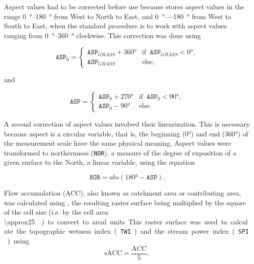 Aspect values had to be corrected before use because  stores aspect values in the range 
\SIrange{0}{+180}{\degree} from West to North to East, and \SIrange{0}{-180}{\degree} from West to South to 
East, when the standard procedure is to work with aspect values ranging from \SIrange{0}{360}{\degree} 
clockwise. This correction was done using

\begin{equation}
 \texttt{ASP}_{0} =
 \begin{cases}
  \texttt{ASP}_{GRASS} + \ang{360} & \text{if}\;\; \texttt{ASP}_{GRASS} < \ang{0}, \\
  \texttt{ASP}_{GRASS}             & \text{else},
 \end{cases}
\end{equation}

\noindent and

\begin{equation}
 \texttt{ASP} =
 \begin{cases}
  \texttt{ASP}_{0} + \ang{270} & \text{if}\;\; \texttt{ASP}_{0} < \ang{90}, \\
  \texttt{ASP}_{0} - \ang{90}  & \text{else}.
 \end{cases}
\end{equation}

\noindent A second correction of aspect values involved their linearization. This is necessary because aspect 
is a circular variable, that is, the beginning (\ang{0}) and end (\ang{360}) of the measurement scale have the 
same physical meaning. Aspect values were transformed to northernness (\texttt{NOR}), a measure of the degree 
of exposition of a given surface to the North, a linear variable, using the equation

\begin{equation}\label{eqn:NOR}
 \texttt{NOR} = abs(\ang{180} - \texttt{ASP}).
\end{equation}  

Flow accumulation (ACC), also known as catchment area or contributing area, was calculated using 
, the resulting raster surface being multiplied by the square of the cell size (i.e. by the 
cell area \SI{\approx25}{\metre\square}) to convert to areal units. This raster surface was used to calculate 
the topographic wetness index (\texttt{TWI}) and the stream power index (\texttt{SPI}) using

\begin{equation}\label{eqn:sACC}
 \text{sACC} = \dfrac{\text{ACC}}{5},
\end{equation}

